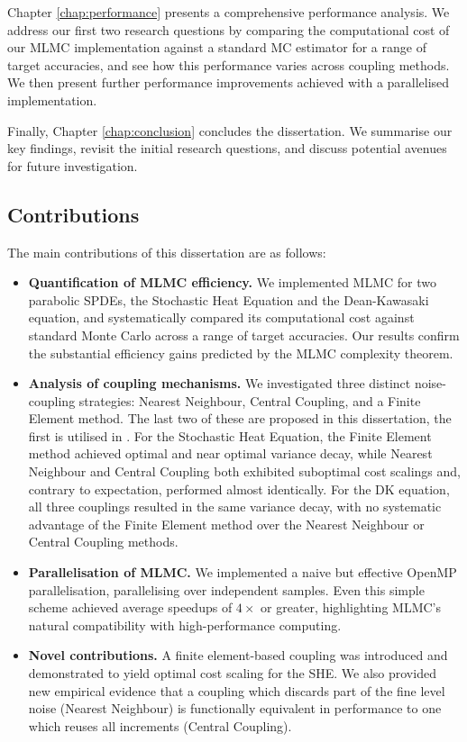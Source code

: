 Chapter \ref{chap:performance} presents a comprehensive performance analysis. 
We address our first two research questions by comparing the 
computational cost of our MLMC implementation against a standard MC 
estimator for a range of target accuracies, and see how this 
performance varies across coupling methods. We then present 
further performance improvements achieved with a parallelised implementation.


Finally, Chapter \ref{chap:conclusion} concludes the dissertation. 
We summarise our key findings, 
revisit the initial research questions, and discuss potential avenues for 
future investigation.

 
\subsection*{Contributions}

The main contributions of this dissertation are as follows:

\begin{itemize}
    \item \textbf{Quantification of MLMC efficiency.} We implemented MLMC for two
    parabolic SPDEs, the Stochastic Heat Equation and the Dean-Kawasaki
    equation, and systematically compared its computational cost against
    standard Monte Carlo across a range of target accuracies. Our results confirm
    the substantial efficiency gains predicted by the MLMC complexity theorem.

    \item \textbf{Analysis of coupling mechanisms.} We investigated
    three distinct noise-coupling strategies: Nearest Neighbour, Central Coupling,
    and a Finite Element method. The last two of these 
    are proposed in this dissertation, the first is utilised in 
    \cite{cornalba2025multilevel}. For the Stochastic Heat Equation, the Finite Element
    method achieved
    optimal and near optimal variance decay,
    while Nearest Neighbour and Central Coupling both exhibited 
    suboptimal cost scalings and, contrary to
    expectation, performed almost identically. For the DK equation, all three
    couplings resulted in the same variance decay, with no systematic advantage of
    the Finite Element method over
    the Nearest Neighbour or Central Coupling methods.

    \item \textbf{Parallelisation of MLMC.} We implemented a naive but effective
    OpenMP parallelisation, parallelising over independent samples. Even this
    simple scheme achieved average speedups of $4\times$ or greater, highlighting
    MLMC's natural compatibility with high-performance computing.

    \item \textbf{Novel contributions.} A finite element-based coupling was introduced
    and demonstrated to yield optimal cost scaling for the SHE. We also provided
    new empirical evidence that a coupling which discards part of the fine level
    noise (Nearest Neighbour) is functionally equivalent in performance to one which
    reuses all
    increments (Central Coupling).
\end{itemize}
